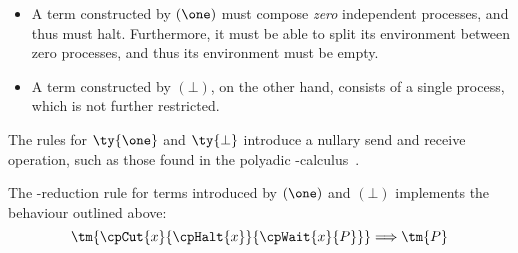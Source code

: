 \documentclass[UKenglish]{llncs}
\begin{document}
\begin{itemize}
\item
  A term constructed by $(\one)$ must compose \emph{zero} independent
  processes, and thus must halt. Furthermore, it must be able to split its
  environment between zero processes, and thus its environment must be empty.
\item
  A term constructed by $(\bot)$, on the other hand, consists of a single
  process, which is not further restricted.
\end{itemize}
The rules for $\ty{\one}$ and $\ty{\bot}$ introduce a nullary send and receive
operation, such as those found in the polyadic \textpi-calculus~\parencite{milner1993}. 
\begin{center}
  \cpInfOne
  \cpInfBot
\end{center}
The \textbeta-reduction rule for terms introduced by $(\one)$ and $(\bot)$
implements the behaviour outlined above:
\[
  \tm{\cpCut{x}{\cpHalt{x}}{\cpWait{x}{P}}}
  \Longrightarrow
  \tm{P}
\]
\end{document}
